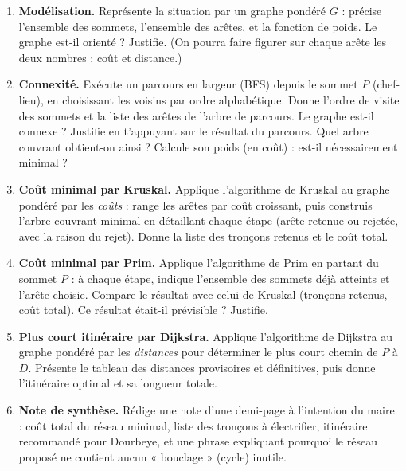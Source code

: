 \documentclass[11pt]{article}
\newcounter{popsec}
\newcounter{popsub}
\newcommand{\courssub}[1]{%
  \stepcounter{popsub}%
  \par\vspace{9pt}\noindent{\popxbold\fontsize{11.5}{13}\selectfont\color{popink}{\color{poporange}\thepopsec.\thepopsub}\hspace{6pt}#1}\par\nopagebreak\vspace{4pt}
}
\begin{document}
\begin{enumerate}
\item \textbf{Modélisation.} Représente la situation par un graphe pondéré $G$ : précise l'ensemble des sommets, l'ensemble des arêtes, et la fonction de poids. Le graphe est-il orienté ? Justifie. (On pourra faire figurer sur chaque arête les deux nombres : coût et distance.)
\item \textbf{Connexité.} Exécute un parcours en largeur (BFS) depuis le sommet $P$ (chef-lieu), en choisissant les voisins par ordre alphabétique. Donne l'ordre de visite des sommets et la liste des arêtes de l'arbre de parcours. Le graphe est-il connexe ? Justifie en t'appuyant sur le résultat du parcours. Quel arbre couvrant obtient-on ainsi ? Calcule son poids (en coût) : est-il nécessairement minimal ?
\item \textbf{Coût minimal par Kruskal.} Applique l'algorithme de Kruskal au graphe pondéré par les \emph{coûts} : range les arêtes par coût croissant, puis construis l'arbre couvrant minimal en détaillant chaque étape (arête retenue ou rejetée, avec la raison du rejet). Donne la liste des tronçons retenus et le coût total.
\item \textbf{Coût minimal par Prim.} Applique l'algorithme de Prim en partant du sommet $P$ : à chaque étape, indique l'ensemble des sommets déjà atteints et l'arête choisie. Compare le résultat avec celui de Kruskal (tronçons retenus, coût total). Ce résultat était-il prévisible ? Justifie.
\item \textbf{Plus court itinéraire par Dijkstra.} Applique l'algorithme de Dijkstra au graphe pondéré par les \emph{distances} pour déterminer le plus court chemin de $P$ à $D$. Présente le tableau des distances provisoires et définitives, puis donne l'itinéraire optimal et sa longueur totale.
\item \textbf{Note de synthèse.} Rédige une note d'une demi-page à l'intention du maire : coût total du réseau minimal, liste des tronçons à électrifier, itinéraire recommandé pour Dourbeye, et une phrase expliquant pourquoi le réseau proposé ne contient aucun « bouclage » (cycle) inutile.
\end{enumerate}

\courssub{Ressources à mobiliser}
\end{document}
